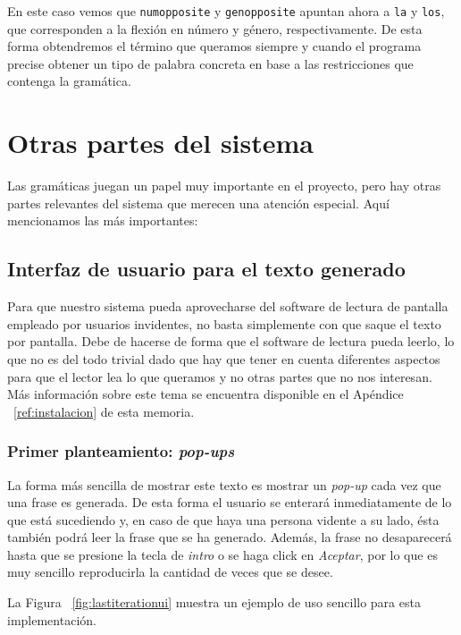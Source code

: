 \noindent En este caso vemos que \texttt{numopposite} y \texttt{genopposite} apuntan ahora a \texttt{la} y \texttt{los}, que corresponden a la flexión en número y género, respectivamente. De esta forma  obtendremos el término que queramos siempre y cuando el programa precise obtener un tipo de palabra concreta en base a las restricciones que contenga la gramática.

\section{Otras partes del sistema}

Las gramáticas juegan un papel muy importante en el proyecto, pero hay otras partes relevantes del sistema que merecen una atención especial. Aquí mencionamos las más importantes:

\subsection{Interfaz de usuario para el texto generado}

Para que nuestro sistema pueda aprovecharse del software de lectura de pantalla empleado por usuarios invidentes, no basta simplemente con que saque el texto por pantalla. Debe de hacerse de forma que el software de lectura pueda leerlo, lo que no es del todo trivial dado que hay que tener en cuenta diferentes aspectos para que el lector lea lo que queramos y no otras partes que no nos interesan. Más información sobre este tema se encuentra disponible en el Apéndice ~\ref{ref:instalacion} de esta memoria.

\subsubsection{Primer planteamiento: \textit{pop-ups}}

La forma más sencilla de mostrar este texto es mostrar un \emph{pop-up} cada vez que una frase es generada. De esta forma el usuario se enterará inmediatamente de lo que está sucediendo y, en caso de que haya una persona vidente a su lado, ésta también podrá leer la frase que se ha generado. Además, la frase no desaparecerá hasta que se presione la tecla de \textit{intro} o se haga click en \textit{Aceptar}, por lo que es muy sencillo reproducirla la cantidad de veces que se desee.

La Figura ~\ref{fig:lastiterationui} muestra un ejemplo de uso sencillo para esta implementación.

